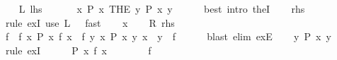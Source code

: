 \begin{isabellebody}
\ \ \isamarkupfalse%
\ L{\isacharcolon}{\kern0pt}\ {\isacharquery}{\kern0pt}lhs\isanewline
\ \ \isamarkupfalse%
\ \isamarkupfalse%
\ {\isasymsection}{\isacharcolon}{\kern0pt}\ {\isachardoublequoteopen}{\isasymforall}x{\isachardot}{\kern0pt}\ P\ x\ {\isacharparenleft}{\kern0pt}THE\ y{\isachardot}{\kern0pt}\ P\ x\ y{\isacharparenright}{\kern0pt}{\isachardoublequoteclose}\isanewline
\ \ \ \ \isamarkupfalse%
\ {\isacharparenleft}{\kern0pt}best\ intro{\isacharcolon}{\kern0pt}\ theI{\isacharprime}{\kern0pt}{\isacharparenright}{\kern0pt}\isanewline
\ \ \isamarkupfalse%
\ {\isacharquery}{\kern0pt}rhs\isanewline
\ \ \ \ \isamarkupfalse%
\ {\isacharparenleft}{\kern0pt}rule\ ex{}I{\isacharparenright}{\kern0pt}\ {\isacharparenleft}{\kern0pt}use\ L\ {\isasymsection}\ \ {\isacartoucheopen}fast{\isacharplus}{\kern0pt}{\isacartoucheclose}{\isacharparenright}{\kern0pt}\isanewline
{}\isamarkupfalse%
\isanewline
\ \ \isamarkupfalse%
\ x\isanewline
\ \ \isamarkupfalse%
\ R{\isacharcolon}{\kern0pt}\ {\isacharquery}{\kern0pt}rhs\isanewline
\ \ \isamarkupfalse%
\ \isamarkupfalse%
\ f\ \ f{\isacharcolon}{\kern0pt}\ {\isachardoublequoteopen}{\isasymforall}x{\isachardot}{\kern0pt}\ P\ x\ {\isacharparenleft}{\kern0pt}f\ x{\isacharparenright}{\kern0pt}{\isachardoublequoteclose}\ \ f{}{\isacharcolon}{\kern0pt}\ {\isachardoublequoteopen}{\isasymAnd}y{\isachardot}{\kern0pt}\ {\isacharparenleft}{\kern0pt}{\isasymforall}x{\isachardot}{\kern0pt}\ P\ x\ {\isacharparenleft}{\kern0pt}y\ x{\isacharparenright}{\kern0pt}{\isacharparenright}{\kern0pt}\ {\isasymLongrightarrow}\ y\ {\isacharequal}{\kern0pt}\ f{\isachardoublequoteclose}\isanewline
\ \ \ \ \isamarkupfalse%
\ {\isacharparenleft}{\kern0pt}blast\ elim{\isacharcolon}{\kern0pt}\ ex{}E{\isacharparenright}{\kern0pt}\isanewline
\ \ \isamarkupfalse%
\ {\isachardoublequoteopen}{\isasymexists}{\isacharbang}{\kern0pt}y{\isachardot}{\kern0pt}\ P\ x\ y{\isachardoublequoteclose}\isanewline
\ \ \isamarkupfalse%
\ {\isacharparenleft}{\kern0pt}rule\ ex{}I{\isacharparenright}{\kern0pt}\isanewline
\ \ \ \ \isamarkupfalse%
\ {\isachardoublequoteopen}P\ x\ {\isacharparenleft}{\kern0pt}f\ x{\isacharparenright}{\kern0pt}{\isachardoublequoteclose}\isanewline
\ \ \ \ \ \ \isamarkupfalse%
\ f\ \isamarkupfalse%

\end{isabellebody}
